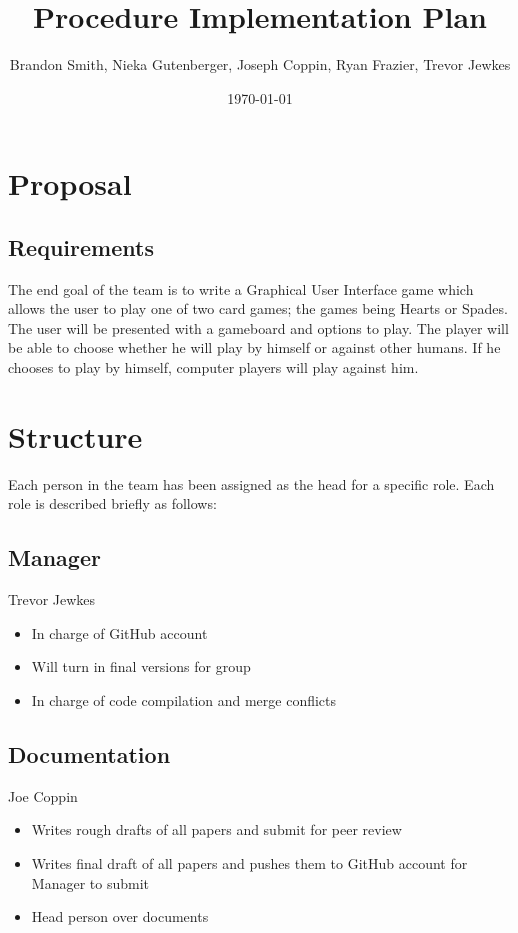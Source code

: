 \documentclass[11pt, titlepage]{article}
\author{Brandon Smith, Nieka Gutenberger, Joseph Coppin, Ryan Frazier, Trevor Jewkes}
\title{Procedure Implementation Plan}
\date{\today}
\begin{document}
	\maketitle
    \setcounter{tocdepth}{1}
\section{Proposal}

    \subsection{Requirements}

    The end goal of the team is to write a Graphical User Interface game which allows the user to play one of two card games; the games being Hearts or Spades.  The user will be presented with a gameboard and options to play. The player will be able to choose whether he will play by himself or against other humans.  If he chooses to play by himself, computer players will play against him.

    \section{Structure}
    	Each person in the team has been assigned as the head for a specific role. Each role is described briefly as follows:
    	
    	\subsection{Manager}
	    Trevor Jewkes
    	\begin{itemize}
    		\item In charge of GitHub account
    		\item Will turn in final versions for group
    		\item In charge of code compilation and merge conflicts
    	\end{itemize}

    \subsection{Documentation}
	    Joe Coppin
    	\begin{itemize}
    		\item Writes rough drafts of all papers and submit for peer review
    		\item Writes final draft of all papers and pushes them to GitHub account for Manager to submit
    		\item Head person over documents
    	\end{itemize}
\end{document}
